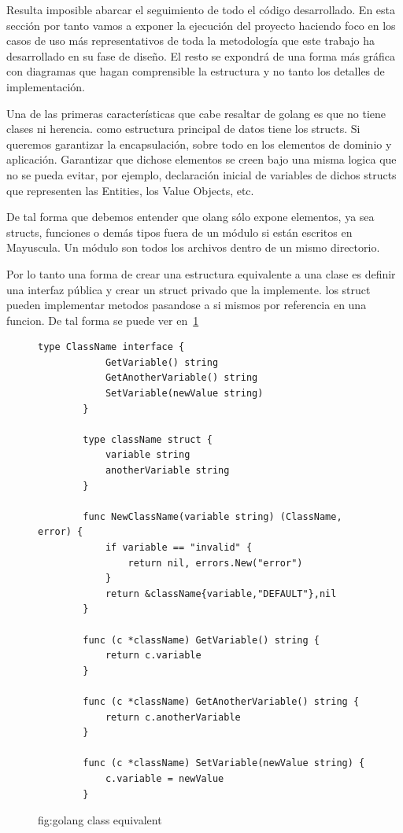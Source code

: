 Resulta imposible abarcar el seguimiento de todo el código desarrollado. En esta sección por tanto vamos a exponer la ejecución del proyecto haciendo foco en los casos de uso más representativos de toda la metodología que este trabajo ha desarrollado en su fase de diseño. El resto se expondrá de una forma más gráfica con diagramas que hagan comprensible la estructura y no tanto los detalles de implementación.

Una de las primeras características que cabe resaltar de golang es que no tiene clases ni herencia. como estructura
principal de datos tiene los structs. Si queremos garantizar la encapsulación, sobre todo en los elementos de dominio y aplicación. Garantizar que dichose elementos se creen bajo una misma logica que no se pueda evitar, por ejemplo, declaración inicial de variables de dichos structs que representen las Entities, los Value Objects, etc.

De tal forma que debemos entender que olang sólo expone elementos, ya sea structs, funciones o demás tipos fuera de un módulo si están escritos en Mayuscula. Un módulo son todos los archivos dentro de un mismo directorio.

Por lo tanto una forma de crear una estructura equivalente a una clase es definir una interfaz pública y crear un struct privado que la implemente. los struct pueden implementar metodos pasandose a si mismos por referencia en una funcion. De tal forma se puede ver en~\cref{fig:golang class equivalent}

\begin{figure}[H]
    \centering
    \begin{lstlisting}[label={lst:lstlisting}]
        type ClassName interface {
            GetVariable() string
            GetAnotherVariable() string
            SetVariable(newValue string)
        }

        type className struct {
            variable string
            anotherVariable string
        }

        func NewClassName(variable string) (ClassName, error) {
            if variable == "invalid" {
                return nil, errors.New("error")
            }
            return &className{variable,"DEFAULT"},nil
        }

        func (c *className) GetVariable() string {
            return c.variable
        }

        func (c *className) GetAnotherVariable() string {
            return c.anotherVariable
        }

        func (c *className) SetVariable(newValue string) {
            c.variable = newValue
        }
    \end{lstlisting}
    \caption{fig:golang class equivalent}\label{fig:golang class equivalent}
\end{figure}

